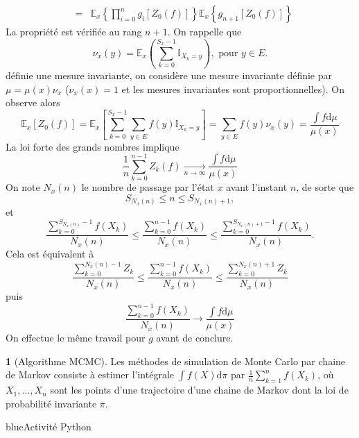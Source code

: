 \documentclass[8pt,notheorems]{beamer}
\def \E{\mathbb E}
\theoremstyle{definition}
\theoremstyle{example}
\newtheorem{remark}{\translate{Remarque}}
\theoremstyle{mystyle}
\theoremstyle{plain}
\begin{document}
\begin{frame}[allowframebreaks]
\begin{eqnarray*}
&=&\E_x\left\{\prod_{i = 0}^{n}g_i[Z_0(f)]\right\}\E_x\left\{g_{n+1}[Z_{0}(f)]\right\}
\end{eqnarray*}
La propriété est vérifiée au rang $n+1$. On rappelle que
$$
\nu_x(y) = \E_x\left(\sum_{k = 0}^{S_x-1}\mathbb{I}_{X_k=y}\right)
,\text{ pour }y\in E.$$
définie une mesure invariante, on considère une mesure invariante définie par $\mu = \mu(x)\nu_x$ ($\nu_x(x)=1$ et les mesures invariantes sont proportionnelles). On observe alors
$$
\E_x\left[Z_0(f)\right] =\E_x\left[\sum_{k = 0}^{S_x -1}\sum_{y\in E}f(y)\mathbb{I}_{X_k =y}\right] = \sum_{y\in E}f(y)\nu_x(y) = \frac{\int f\text{d}\mu}{\mu(x)}
$$
La loi forte des grands nombres implique
$$
\frac{1}{n}\sum_{k = 0}^{n-1}Z_k(f)\underset{n\rightarrow\infty}{\longrightarrow}\frac{\int f\text{d}\mu}{\mu(x)}
$$
On note $N_x(n)$ le nombre de passage par l'état $x$ avant l'instant $n$, de sorte que
$$
S_{N_x(n)}\leq n\leq S_{N_x(n)+1},
$$
et
$$
\frac{\sum_{k = 0}^{S_{N_x(n)}-1}f(X_k)}{N_x(n)}\leq \frac{\sum_{k = 0}^{n-1}f(X_k)}{N_x(n)}\leq \frac{\sum_{k = 0}^{S_{N_x(n)+1}-1}f(X_k)}{N_x(n)}.
$$
Cela est équivalent à
$$
\frac{\sum_{k = 0}^{N_x(n)-1}Z_k}{N_x(n)}\leq \frac{\sum_{k = 0}^{n-1}f(X_k)}{N_x(n)}\leq \frac{\sum_{k = 0}^{N_x(n)+1}Z_k}{N_x(n)}
$$
puis
$$
\frac{\sum_{k = 0}^{n-1}f(X_k)}{N_x(n)}\rightarrow \frac{\int f\text{d}\mu}{\mu(x)}
$$
On effectue le même travail pour $g$ avant de conclure.
\begin{remark}[Algorithme MCMC]
Les méthodes de simulation de Monte Carlo par chaine de Markov consiste à estimer l'intégrale $\int f(X)\text{d}\pi$ par $\frac{1}{n}\sum_{k=1}^{n} f(X_{k})$, où $X_1,\ldots,X_n$ sont les points d'une trajectoire d'une chaine de Markov dont la loi de probabilité invariante $\pi$. \begin{color}{blue}Activité Python\end{color}
\end{remark}
\end{frame}
\end{document}
